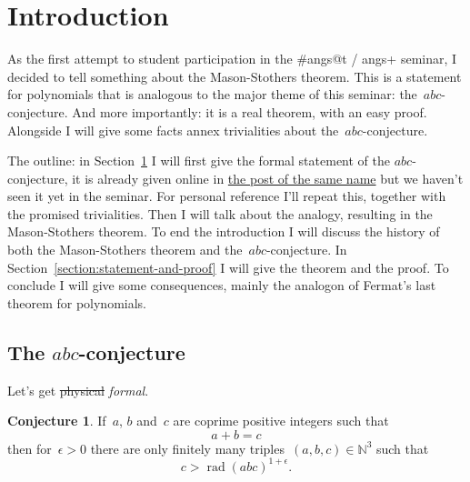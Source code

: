 \documentclass[11pt, a4paper, openany, oneside, article]{memoir}
\theoremstyle{definition}
\newtheorem{conjecture}[theorem]{Conjecture}
\DeclareMathOperator\rad{rad}
\begin{document}
\title{}
\author{Pieter Belmans}
\maketitle

\section{Introduction}
\label{section:introduction}

As the first attempt to student participation in the \#angs@t / angs+ seminar, I decided to tell something about the Mason-Stothers theorem. This is a statement for polynomials that is analogous to the major theme of this seminar: the~$abc$\nobreakdash-conjecture. And more importantly: it is a real theorem, with an easy proof. Alongside I will give some facts annex trivialities about the~$abc$\nobreakdash-conjecture.

The outline: in Section~\ref{section:introduction} I will first give the formal statement of the $abc$-conjecture, it is already given online in \href{http://www.noncommutative.org/index.php/the-abc-conjecture.html}{the post of the same name} but we haven't seen it yet in the seminar. For personal reference I'll repeat this, together with the promised trivialities. Then I will talk about the analogy, resulting in the Mason-Stothers theorem. To end the introduction I will discuss the history of both the Mason-Stothers theorem and the~$abc$\nobreakdash-conjecture. In Section~\ref{section:statement-and-proof} I will give the theorem and the proof. To conclude I will give some consequences, mainly the analogon of Fermat's last theorem for polynomials.

\subsection{The $abc$-conjecture}

Let's get \sout{physical} \emph{formal}.

\begin{conjecture}
  \label{conjecture:abc}
  If~$a$, $b$ and~$c$ are coprime positive integers such that
  \begin{equation}
    \label{equation:abc-equality}
    a+b=c
  \end{equation}
  then for~$\epsilon>0$ there are only finitely many triples~$(a,b,c)\in\mathbb{N}^3$ such that
  \begin{equation}
    \label{equation:abc-inequality}
    c>\rad(abc)^{1+\epsilon}.
  \end{equation}
\end{conjecture}
\end{document}
